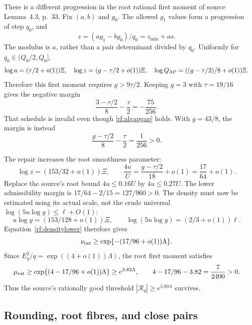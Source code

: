There is a different progression in the root rational first moment
of source Lemma~4.3, p.~33.  Fix $(a,b)$ and $g_0$.
The allowed $g_1$ values form a progression of step $q_0$, and
\[
 z=(ag_1-bg_0)/q_0=z_{\min}+as.
\]
The modulus is $a$, rather than a pair determinant divided by
$q_0$.  Uniformly for $q_0\in(Q_0/2,Q_0]$,
\[
 \log a=(\tau/2+o(1))\Xi,\quad
 \log z=(g-\tau/2+o(1))\Xi,\quad
 \log Q_{\rm AP}=((g-\tau/2)/8+o(1))\Xi.
\]
Therefore this first moment requires $g>9\tau/2$.
Keeping $g=3$ with $\tau=19/16$ gives the negative margin
\begin{equation}
 \frac{3-\tau/2}{8}-\frac\tau2=-\frac{75}{256}.
 \label{rf:failedgap}
\end{equation}
That schedule is invalid even though \eqref{rf:algapgap} holds.
With $g=43/8$, the margin is instead
\begin{equation}
 \frac{g-\tau/2}{8}-\frac\tau2=\frac1{256}>0.
 \label{rf:rootapgap}
\end{equation}

The repair increases the root smoothness parameter:
\[
 \log z=(153/32+o(1))\Xi,\qquad
 \frac{4u}{U}=\frac{g-\tau/2}{18}+o(1)=\frac{17}{64}+o(1).
\]
Replace the source's root bound $4u\le0.16U$ by $4u\le0.27U$.
The lower admissibility margin is
$17/64-2/15=127/960>0$.
The density must now be estimated using its actual scale, not the
crude universal $\log(5u\log y)\le\ell+O(1)$:
\[
 u\log y=(153/128+o(1))\Xi,\qquad
 \log(5u\log y)=(2/3+o(1))\ell.
\]
Equation~\eqref{rf:densitylower} therefore gives
\begin{equation}
 \nu_{\rm rat}\ge
 \exp\{-(17/96+o(1))\Lambda\}.
 \label{rf:ratdensity}
\end{equation}
Since $E_q^2/q=\exp((4+o(1))\Lambda)$, the root first moment
satisfies
\begin{equation}
 \mu_{\rm rat}\ge
 \exp\{(4-17/96+o(1))\Lambda\}\ge e^{3.82\Lambda},
 \qquad 4-17/96-3.82=\frac7{2400}>0.
 \label{rf:ratmean}
\end{equation}
Thus the source's rationally good threshold
$|\mathcal R_q|\ge e^{3.80\Lambda}$ survives.

\subsection{Rounding, root fibres, and close pairs}

